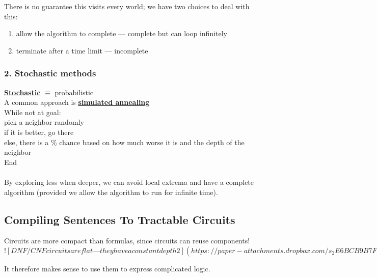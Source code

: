 \documentclass[../../lecture_notes.tex]{subfiles}
\begin{document}
\noindent There is no guarantee this visits every world; we have two choices to deal with this:
\begin{enumerate} [itemsep=0mm]
	\item allow the algorithm to complete — complete but can loop infinitely
	\item terminate after a time limit — incomplete
\end{enumerate}

\subsubsection*{2. Stochastic methods}
\noindent \textbf{\underline{Stochastic}} $\equiv$ probabilistic\\
A common approach is \textbf{\underline{simulated annealing}}\\
While not at goal:\\
\indent pick a neighbor randomly\\
\indent if it is better, go there\\
\indent else, there is a \% chance based on how much worse it is and the depth of the neighbor\\
End\\
\\
By exploring less when deeper, we can avoid local extrema and have a complete algorithm 
\indent (provided we allow the algorithm to run for infinite time).\\


\subsection*{Compiling Sentences To Tractable Circuits}
\noindent Circuits are more compact than formulas, since circuits can reuse components!\\

\newpage
$![DNF/CNF circuits are flat — they have a constant depth 2](https://paper-attachments.dropbox.com/s_2E6BCB9B7FA7CA166B30D63D0EE6631CB92348B5FD5B0AE0D0B6403B17C7DD96_1588412155172_Untitled+drawing+19.jpg)$
\newpage

\noindent It therefore makes sense to use them to express complicated logic.\\
\end{document}

